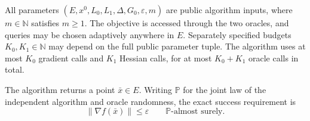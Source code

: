 \documentclass[10pt]{article}
\theoremstyle{definition}
\begin{document}
All parameters $(E,x^0,L_0,L_1,\Delta,G_0,\varepsilon,m)$ are public algorithm inputs, where $m\in\mathbb{N}$ satisfies $m\geq1$. The objective is accessed through the two oracles, and queries may be chosen adaptively anywhere in $E$. Separately specified budgets $K_0,K_1\in\mathbb{N}$ may depend on the full public parameter tuple. The algorithm uses at most $K_0$ gradient calls and $K_1$ Hessian calls, for at most $K_0+K_1$ oracle calls in total.

The algorithm returns a point $\bar{x}\in E$. Writing $\mathbb{P}$ for the joint law of the independent algorithm and oracle randomness, the exact success requirement is
\[
\|\nabla f(\bar{x})\|\leq\varepsilon
\qquad \mathbb{P}\text{-almost surely}.
\]
\end{document}
